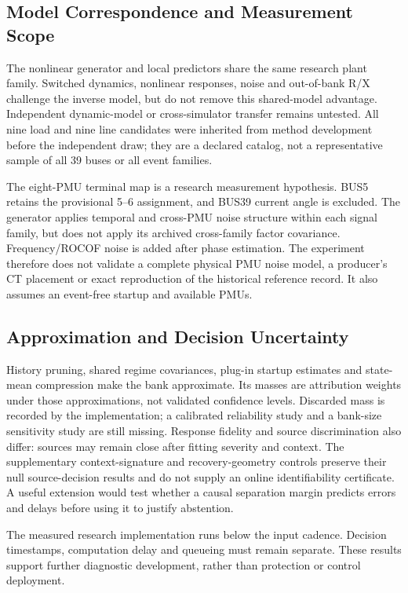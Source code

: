 \subsection{Model Correspondence and Measurement Scope}
The nonlinear generator and local predictors share the same research
plant family. Switched dynamics, nonlinear responses, noise and out-of-bank
R/X challenge the inverse model, but do not remove this shared-model
advantage. Independent dynamic-model or cross-simulator transfer remains
untested. All nine load and nine line candidates were inherited from
method development before the independent draw; they are a declared
catalog, not a representative sample of all 39 buses or all event families.

The eight-PMU terminal map is a research measurement hypothesis. BUS5
retains the provisional 5--6 assignment, and BUS39 current angle is excluded.
The generator applies temporal and cross-PMU noise structure within each
signal family, but does not apply its archived cross-family factor
covariance. Frequency/ROCOF noise is added after phase estimation.
The experiment therefore does not validate a complete physical PMU noise
model, a producer's CT placement or exact reproduction of the historical
reference record. It also assumes an event-free startup and available PMUs.

\subsection{Approximation and Decision Uncertainty}
History pruning, shared regime covariances, plug-in startup estimates and
state-mean compression make the bank approximate. Its masses are
attribution weights under those approximations, not validated confidence
levels. Discarded mass is recorded by the implementation; a calibrated
reliability study and a bank-size sensitivity study are still missing.
Response fidelity and source discrimination also differ: sources may
remain close after fitting severity and context. The supplementary
context-signature and recovery-geometry controls preserve their null
source-decision results and do not supply an online identifiability
certificate. A useful extension would test whether a causal separation
margin predicts errors and delays before using it to justify abstention.

The measured research implementation runs below the input cadence.
Decision timestamps, computation delay and queueing must remain separate.
These results support further diagnostic development, rather than
protection or control deployment.
